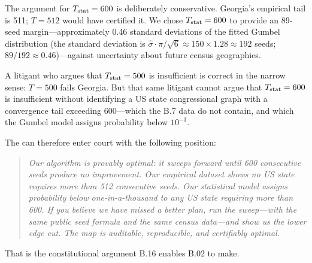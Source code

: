 The argument for $T_{\mathrm{stat}} = 600$ is deliberately conservative.
Georgia's empirical tail is 511; $T = 512$ would have certified it.
We chose $T_{\mathrm{stat}} = 600$ to provide an 89-seed margin---approximately 0.46
standard deviations of the fitted Gumbel distribution (the standard deviation
is $\hat\sigma \cdot \pi/\sqrt{6} \approx 150 \times 1.28 \approx 192$ seeds;
$89/192 \approx 0.46$)---against uncertainty about future census geographies.

A litigant who argues that $T_{\mathrm{stat}} = 500$ is insufficient is correct in the
narrow sense: $T = 500$ fails Georgia.
But that same litigant cannot argue that $T_{\mathrm{stat}} = 600$ is insufficient without
identifying a US state congressional graph with a convergence tail exceeding
600---which the B.7 data do not contain, and which the Gumbel model assigns
probability below $10^{-3}$.

The \dia{} can therefore enter court with the following position:
\begin{quote}
  \itshape
  Our algorithm is provably optimal: it sweeps forward until 600 consecutive
  seeds produce no improvement.
  Our empirical dataset shows no US state requires more than 512 consecutive
  seeds.
  Our statistical model assigns probability below one-in-a-thousand to any US
  state requiring more than 600.
  If you believe we have missed a better plan, run the sweep---with the same
  public seed formula and the same census data---and show us the lower edge cut.
  The map is auditable, reproducible, and certifiably optimal.
\end{quote}

That is the constitutional argument B.16 enables B.02 to make.
